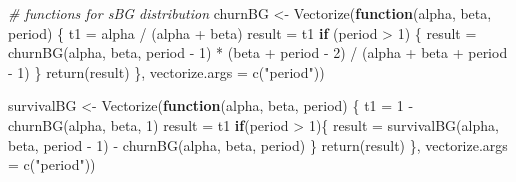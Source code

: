 \documentclass[
]{book}
\newenvironment{Shaded}{\begin{snugshade}}{\end{snugshade}}
\newcommand{\AttributeTok}[1]{\textcolor[rgb]{0.77,0.63,0.00}{#1}}
\newcommand{\CommentTok}[1]{\textcolor[rgb]{0.56,0.35,0.01}{\textit{#1}}}
\newcommand{\ControlFlowTok}[1]{\textcolor[rgb]{0.13,0.29,0.53}{\textbf{#1}}}
\newcommand{\DecValTok}[1]{\textcolor[rgb]{0.00,0.00,0.81}{#1}}
\newcommand{\FunctionTok}[1]{\textcolor[rgb]{0.00,0.00,0.00}{#1}}
\newcommand{\NormalTok}[1]{#1}
\newcommand{\OtherTok}[1]{\textcolor[rgb]{0.56,0.35,0.01}{#1}}
\newcommand{\SpecialCharTok}[1]{\textcolor[rgb]{0.00,0.00,0.00}{#1}}
\newcommand{\StringTok}[1]{\textcolor[rgb]{0.31,0.60,0.02}{#1}}
\begin{document}
\begin{Shaded}
\begin{Highlighting}[]
\CommentTok{\# functions for sBG distribution}
\NormalTok{churnBG }\OtherTok{\textless{}{-}} \FunctionTok{Vectorize}\NormalTok{(}\ControlFlowTok{function}\NormalTok{(alpha, beta, period) \{}
\NormalTok{        t1 }\OtherTok{=}\NormalTok{ alpha }\SpecialCharTok{/}\NormalTok{ (alpha }\SpecialCharTok{+}\NormalTok{ beta)}
\NormalTok{        result }\OtherTok{=}\NormalTok{ t1}
        \ControlFlowTok{if}\NormalTok{ (period }\SpecialCharTok{\textgreater{}} \DecValTok{1}\NormalTok{) \{}
\NormalTok{                result }\OtherTok{=} \FunctionTok{churnBG}\NormalTok{(alpha, beta, period }\SpecialCharTok{{-}} \DecValTok{1}\NormalTok{) }\SpecialCharTok{*}\NormalTok{ (beta }\SpecialCharTok{+}\NormalTok{ period }\SpecialCharTok{{-}} \DecValTok{2}\NormalTok{) }\SpecialCharTok{/}\NormalTok{ (alpha }\SpecialCharTok{+}\NormalTok{ beta }\SpecialCharTok{+}\NormalTok{ period }\SpecialCharTok{{-}} \DecValTok{1}\NormalTok{)}
\NormalTok{        \}}
        \FunctionTok{return}\NormalTok{(result)}
\NormalTok{\}, }\AttributeTok{vectorize.args =} \FunctionTok{c}\NormalTok{(}\StringTok{"period"}\NormalTok{))}
 
\NormalTok{survivalBG }\OtherTok{\textless{}{-}} \FunctionTok{Vectorize}\NormalTok{(}\ControlFlowTok{function}\NormalTok{(alpha, beta, period) \{}
\NormalTok{        t1 }\OtherTok{=} \DecValTok{1} \SpecialCharTok{{-}} \FunctionTok{churnBG}\NormalTok{(alpha, beta, }\DecValTok{1}\NormalTok{)}
\NormalTok{        result }\OtherTok{=}\NormalTok{ t1}
        \ControlFlowTok{if}\NormalTok{(period }\SpecialCharTok{\textgreater{}} \DecValTok{1}\NormalTok{)\{}
\NormalTok{                result }\OtherTok{=} \FunctionTok{survivalBG}\NormalTok{(alpha, beta, period }\SpecialCharTok{{-}} \DecValTok{1}\NormalTok{) }\SpecialCharTok{{-}} \FunctionTok{churnBG}\NormalTok{(alpha, beta, period)}
\NormalTok{        \}}
        \FunctionTok{return}\NormalTok{(result)}
\NormalTok{\}, }\AttributeTok{vectorize.args =} \FunctionTok{c}\NormalTok{(}\StringTok{"period"}\NormalTok{))}
 

\end{Highlighting}
\end{Shaded}
\end{document}
